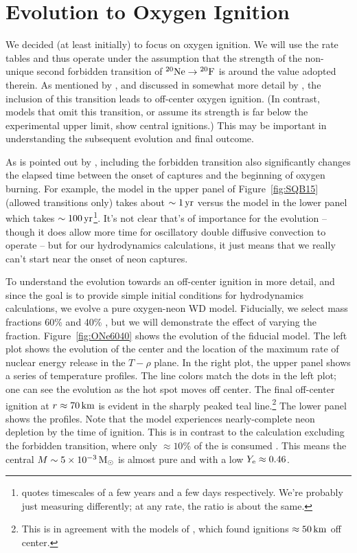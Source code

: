 \documentclass[modern]{aastex62}
\begin{document}
\section{Evolution to Oxygen Ignition}

We decided (at least initially) to focus on oxygen ignition.  We will
use the \citet{Suzuki2016a} rate tables and thus operate under the
assumption that the strength of the non-unique second forbidden
transition of $\neon[20] \to \fluorine[20]$ is around the value
adopted therein.  As mentioned by \citet{Schwab2015}, and discussed in
somewhat more detail by \citet{Moller2017}, the inclusion of this
transition leads to off-center oxygen ignition.  (In contrast, models
that omit this transition, or assume its strength is far below the
experimental upper limit, show central ignitions.)  This may be
important in understanding the subsequent evolution and final outcome.


As is pointed out by \citet{Moller2017}, including the forbidden
transition also significantly changes the elapsed time between the
onset of \neon[20] captures and the beginning of oxygen burning.  For
example, the model in the upper panel of Figure~\ref{fig:SQB15}
(allowed transitions only) takes about $\sim \unit[1]{yr}$ versus the
model in the lower panel \citep[tables from][]{Suzuki2016a} which
takes $\sim \unit[100]{yr}$\footnote{\citet{Moller2017} quotes
  timescales of a few years and a few days respectively.  We're
  probably just measuring differently; at any rate, the ratio is about
  the same.}.  It's not clear that's of importance for the evolution
-- though it does allow more time for oscillatory double diffusive
convection to operate -- but for our hydrodynamics calculations, it
just means that we really can't start near the onset of neon captures.


To understand the evolution towards an off-center ignition in more
detail, and since the goal is to provide simple initial conditions for
hydrodynamics calculations, we evolve a pure oxygen-neon WD model.
Fiducially, we select mass fractions 60\% \oxygen[16] and 40\%
\neon[20], but we will demonstrate the effect of varying the \neon[20]
fraction.  Figure~\ref{fig:ONe6040} shows the evolution of the
fiducial model.  The left plot shows the evolution of the center and
the location of the maximum rate of nuclear energy release in the
$T-\rho$ plane.  In the right plot, the upper panel shows a series of
temperature profiles. The line colors match the dots in the left plot;
one can see the evolution as the hot spot moves off center.  The final
off-center ignition at $r \approx \unit[70]{km}$ is evident in the
sharply peaked teal line.\footnote{This is in agreement with the
  models of \citet{Moller2017}, which found ignitions
  $\approx \unit[50]{km}$ off center.}  The lower panel shows the
\neon[20] profiles.  Note that the model experiences nearly-complete
neon depletion by the time of ignition.  This is in contrast to the
calculation excluding the forbidden transition, where only
$\approx 10\%$ of the \neon[20] is consumed \citep[see Figure 5
in][]{Schwab2015}.  This means the central
$M \sim \unit[5 \times 10^{-3}]{\Msun}$ is almost pure \oxygen[16] and
\oxygen[20] with a low $\Ye \approx 0.46$.
\end{document}
